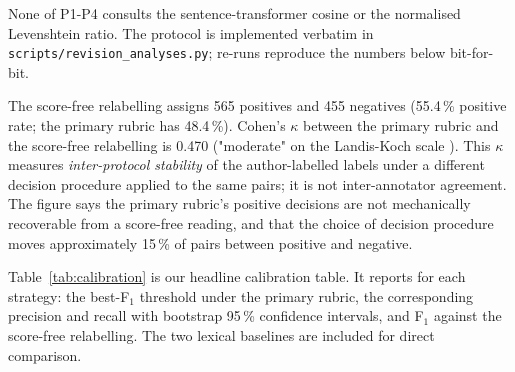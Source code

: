 \documentclass[11pt,a4paper]{article}
\begin{document}
None of P1-P4 consults the sentence-transformer cosine or the
normalised Levenshtein ratio. The protocol is implemented verbatim
in \texttt{scripts/revision\_analyses.py}; re-runs reproduce the
numbers below bit-for-bit.

The score-free relabelling assigns 565 positives and 455 negatives
(55.4\,\% positive rate; the primary rubric has 48.4\,\%). Cohen's
$\kappa$ between the primary rubric and the score-free relabelling
is 0.470 ("moderate" on the Landis-Koch scale
\citep{landis1977kappa}). This $\kappa$ measures \emph{inter-protocol
stability} of the author-labelled labels under a different decision
procedure applied to the same pairs; it is not inter-annotator
agreement. The figure says the primary rubric's positive decisions
are not mechanically recoverable from a score-free reading, and that
the choice of decision procedure moves approximately 15\,\% of
pairs between positive and negative.

Table~\ref{tab:calibration} is our headline calibration table. It
reports for each strategy: the best-F$_1$ threshold under the primary
rubric, the corresponding precision and recall with bootstrap
95\,\% confidence intervals, and F$_1$ against the score-free
relabelling. The two lexical baselines are included for direct
comparison.
\end{document}
